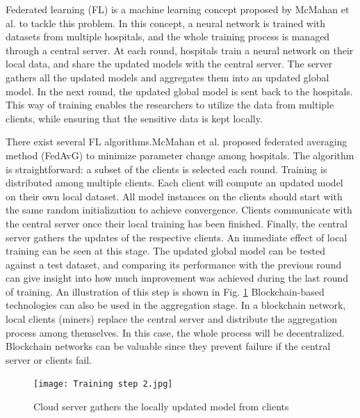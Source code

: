 Federated learning (FL) \cite{mcmahan2017communication} 
is a machine learning concept proposed by McMahan et al. to tackle this problem. In this concept, a neural network is trained with datasets from multiple hospitals, and the whole training process is managed through a central server. At each round, hospitals train a neural network on their local data, and share the updated models with the central server. The server gathers all the updated models and aggregates them into an updated global model. In the next round, the updated global model is sent back to the hospitals. This way of training enables the researchers to utilize the data from multiple clients, while ensuring that the sensitive data is kept locally. 


There exist several FL algorithms.McMahan et al. \cite{mcmahan2017communication} proposed federated averaging method (FedAvG) to minimize parameter change among hospitals. The algorithm is straightforward: a subset of the clients is selected each round. Training is distributed among multiple clients. Each client will compute an updated model on their own local dataset. All model instances on the clients should start with the same random initialization to achieve convergence. Clients communicate with the central server once their local training has been finished. Finally, the central server gathers the updates of the respective clients. An immediate effect of local training can be seen at this stage. The updated global model can be tested against a test dataset, and comparing its performance with the previous round can give insight into how much improvement was achieved during the last round of training. An illustration of this step is shown in Fig. \ref{fig:train2} Blockchain-based technologies can also be used in the aggregation stage. In a blockchain network, local clients (miners) replace the central server and distribute the aggregation process among themselves. In this case, the whole process will be decentralized. Blockchain networks can be valuable since they prevent failure if the central server or clients fail.\cite{wang2021blockchain} \newpage 
\begin{figure}[h!]
 \centering
  \texttt{[image: Training step 2.jpg]}
  \caption{Cloud server gathers the locally updated model from clients }
  \label{fig:train2}
\end{figure}


